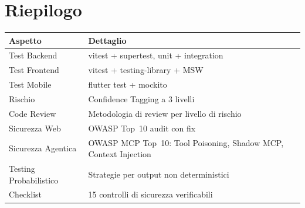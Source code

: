 \section*{Riepilogo}

\begin{center}
\begin{tabularx}{\textwidth}{l X}
\toprule
\textbf{Aspetto} & \textbf{Dettaglio} \\
\midrule
Test Backend & vitest + supertest, unit + integration \\
Test Frontend & vitest + testing-library + MSW \\
Test Mobile & flutter test + mockito \\
Rischio & Confidence Tagging a 3 livelli \\
Code Review & Metodologia di review per livello di rischio \\
Sicurezza Web & OWASP Top~10 audit con fix \\
Sicurezza Agentica & OWASP MCP Top~10: Tool Poisoning, Shadow MCP, Context Injection \\
Testing Probabilistico & Strategie per output non deterministici \\
Checklist & 15 controlli di sicurezza verificabili \\
\bottomrule
\end{tabularx}
\end{center}
